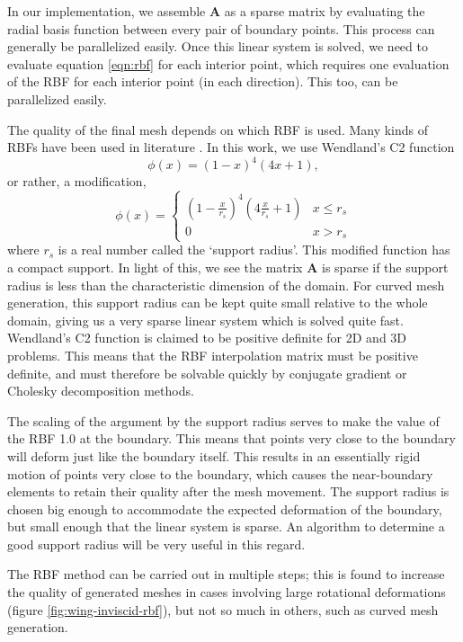  In our implementation, we assemble $\mathbf{A}$ as a sparse matrix by evaluating the radial basis function between every pair of boundary points. This process can generally be parallelized easily. Once this linear system is solved, we need to evaluate equation \eqref{eqn:rbf} for each interior point, which requires one evaluation of the RBF for each interior point (in each direction). This too, can be parallelized easily.
 
 The quality of the final mesh depends on which RBF is used. Many kinds of RBFs have been used in literature \cite{mm:rbf, mm:rbf2}. In this work, we use Wendland's C2 function
 \begin{equation}
 \phi(x) = (1-x)^4(4x + 1),
 \end{equation}
 or rather, a modification,
 \begin{equation}
 \phi(x) = 
 \begin{cases}
 \left(1-\frac{x}{r_s}\right)^4\left(4\frac{x}{r_s} + 1\right) & x \leq r_s \\
 0 & x > r_s
 \end{cases}
 \end{equation}
 where $r_s$ is a real number called the `support radius'. This modified function has a compact support. In light of this, we see the matrix $\mathbf{A}$ is sparse if the support radius is less than the characteristic dimension of the domain. For curved mesh generation, this support radius can be kept quite small relative to the whole domain, giving us a very sparse linear system which is solved quite fast. Wendland's C2 function is claimed to be positive definite \cite{rbf:errorwendland} for 2D and 3D problems. This means that the RBF interpolation matrix must be positive definite, and must therefore be solvable quickly by conjugate gradient or Cholesky decomposition methods.
 
 The scaling of the argument by the support radius serves to make the value of the RBF 1.0 at the boundary. This means that points very close to the boundary will deform just like the boundary itself. This results in an essentially rigid motion of points very close to the boundary, which causes the near-boundary elements to retain their quality after the mesh movement. The support radius is chosen big enough to accommodate the expected deformation of the boundary, but small enough that the linear system is sparse. An algorithm to determine a good support radius will be very useful in this regard.
 
 The RBF method can be carried out in multiple steps; this is found to increase the quality of generated meshes in cases involving large rotational deformations (figure \ref{fig:wing-inviscid-rbf}), but not so much in others, such as curved mesh generation.
 
